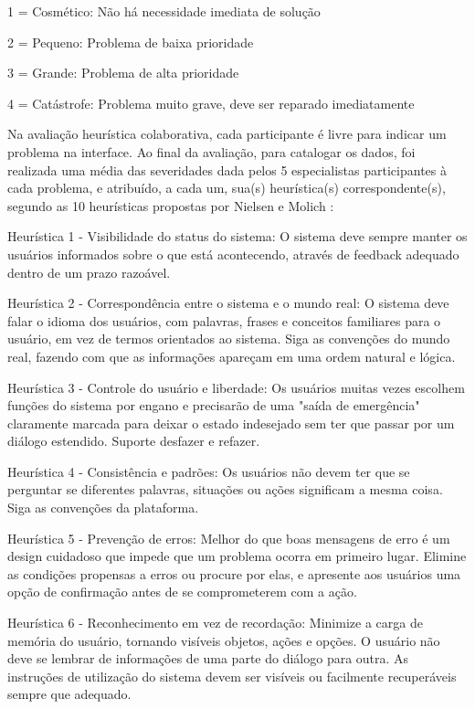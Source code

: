 1 = Cosmético: Não há necessidade imediata de solução

2 = Pequeno: Problema de baixa prioridade

3 = Grande: Problema de alta prioridade

4 = Catástrofe: Problema muito grave, deve ser reparado imediatamente


Na avaliação heurística colaborativa, cada participante é livre para indicar um problema na interface.  Ao final da avaliação, para catalogar os dados, foi realizada uma média das severidades dada pelos 5 especialistas participantes à cada problema, e atribuído, a cada um, sua(s) heurística(s) correspondente(s), segundo as 10 heurísticas propostas por Nielsen e Molich \cite{Nielsen:1990:HEU:97243.97281}:


Heurística 1 - Visibilidade do status do sistema: O sistema deve sempre manter os usuários informados sobre o que está acontecendo, através de feedback adequado dentro de um prazo razoável.

Heurística 2 - Correspondência entre o sistema e o mundo real: O sistema deve falar o idioma dos usuários, com palavras, frases e conceitos familiares para o usuário, em vez de termos orientados ao sistema. Siga as convenções do mundo real, fazendo com que as informações apareçam em uma ordem natural e lógica.


Heurística 3 - Controle do usuário e liberdade: Os usuários muitas vezes escolhem funções do sistema por engano e precisarão de uma "saída de emergência" claramente marcada para deixar o estado indesejado sem ter que passar por um diálogo estendido. Suporte desfazer e refazer.

Heurística 4 -  Consistência e padrões: Os usuários não devem ter que se perguntar se diferentes palavras, situações ou ações significam a mesma coisa. Siga as convenções da plataforma.

Heurística 5 - Prevenção de erros: Melhor do que boas mensagens de erro é um design cuidadoso que impede que um problema ocorra em primeiro lugar. Elimine as condições propensas a erros ou procure por elas, e apresente aos usuários uma opção de confirmação antes de se comprometerem com a ação.

Heurística 6 - Reconhecimento em vez de recordação: Minimize a carga de memória do usuário, tornando visíveis objetos, ações e opções. O usuário não deve se lembrar de informações de uma parte do diálogo para outra. As instruções de utilização do sistema devem ser visíveis ou facilmente recuperáveis sempre que adequado.        

